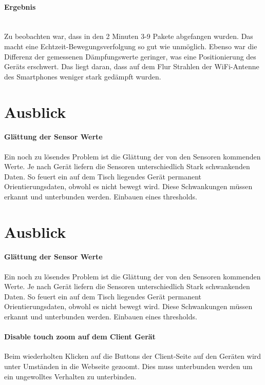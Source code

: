 \documentclass[a4paper]{spie}  %
\begin{document}
\paragraph{Ergebnis}\mbox{}\\
Zu beobachten war, dass in den 2 Minuten 3-9 Pakete abgefangen wurden. Das macht eine Echtzeit-Bewegungsverfolgung so gut wie unmöglich. Ebenso war die Differenz der gemessenen Dämpfungswerte geringer, was eine Positionierung des Geräts erschwert. Das liegt daran, dass auf dem Flur Strahlen der WiFi-Antenne des Smartphones weniger stark gedämpft wurden. 




\section{Ausblick}

\paragraph{Glättung der Sensor Werte} Ein noch zu lösendes Problem ist die Glättung der von den Sensoren kommenden Werte. Je nach Gerät liefern die Sensoren unterschiedlich Stark schwankenden Daten. So feuert ein auf dem Tisch liegendes Gerät permanent Orientierungsdaten, obwohl es nicht bewegt wird. Diese Schwankungen müssen erkannt und unterbunden werden. Einbauen eines thresholds.


\section{Ausblick}

\paragraph{Glättung der Sensor Werte} Ein noch zu lösendes Problem ist die Glättung der von den Sensoren kommenden Werte. Je nach Gerät liefern die Sensoren unterschiedlich Stark schwankenden Daten. So feuert ein auf dem Tisch liegendes Gerät permanent Orientierungsdaten, obwohl es nicht bewegt wird. Diese Schwankungen müssen erkannt und unterbunden werden. Einbauen eines thresholds.

\paragraph{Disable touch zoom auf dem Client Gerät}
Beim wiederholten Klicken auf die Buttons der Client-Seite auf den Geräten wird unter Umständen in die Webseite gezoomt. Dies muss unterbunden werden um ein ungewolltes Verhalten zu unterbinden.
\end{document}
